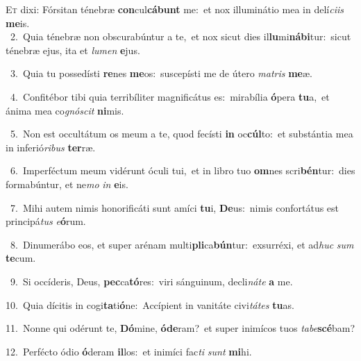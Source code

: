 \lettrine{\initial\textcolor{\initialcolor}{E}}{t} dixi: Fórsitan ténebræ \textbf{con}\-cul\-\textbf{cá}\-\textbf{bunt} me:~\star et nox illuminátio mea in delí\-\textit{ci}\-\textit{is} \textbf{me}\-is.\\
{\numbfont\textcolor{\numbcolor}{~2.}}~Quia ténebræ non obscurabúntur a te,~\dagger et nox sicut dies il\-\textbf{lu}\-mi\-\textbf{ná}\-\textbf{bi}tur:~\star sicut ténebræ ejus, ita et \textit{lu}\-\textit{men} \textbf{e}\-jus.\par
{\numbfont\textcolor{\numbcolor}{~3.}}~Quia tu possedísti \textbf{re}\-nes \textbf{me}\-os:~\star suscepísti me de útero \textit{ma}\-\textit{tris} \textbf{me}\-æ.\par
{\numbfont\textcolor{\numbcolor}{~4.}}~Confitébor tibi quia terribíliter magnificátus es:~\dagger mirabília \textbf{ó}\-pera \textbf{tu}\-a,~\star et ánima mea co\-\textit{gnó}\-\textit{scit} \textbf{ni}\-mis.\par
{\numbfont\textcolor{\numbcolor}{~5.}}~Non est occultátum os meum a te, quod fecísti \textbf{in} oc\-\textbf{cúl}\-to:~\star et substántia mea in inferió\-\textit{ri}\-\textit{bus} \textbf{ter}\-ræ.\par
{\numbfont\textcolor{\numbcolor}{~6.}}~Imperféctum meum vidérunt óculi tui,~\dagger et in libro tuo \textbf{om}\-nes scri\-\textbf{bén}\-tur:~\star dies formabúntur, et ne\textit{mo} \textit{in} \textbf{e}\-is.\par
{\numbfont\textcolor{\numbcolor}{~7.}}~Mihi autem nimis honorificáti sunt amíci \textbf{tu}\-i, \textbf{De}\-us:~\star nimis confortátus est principá\textit{tus} \textit{e}\-\textbf{ó}rum.\par
{\numbfont\textcolor{\numbcolor}{~8.}}~Dinumerábo eos, et super arénam multi\-\textbf{pli}\-ca\-\textbf{bún}\-tur:~\star exsurréxi, et ad\textit{huc} \textit{sum} \textbf{te}\-cum.\par
{\numbfont\textcolor{\numbcolor}{~9.}}~Si occíderis, Deus, \textbf{pec}\-ca\-\textbf{tó}\-res:~\star viri sánguinum, decli\-\textit{ná}\-\textit{te} \textbf{a} me.\par
{\numbfont\textcolor{\numbcolor}{10.}}~Quia dícitis in cogi\-\textbf{ta}\-ti\-\textbf{ó}\-ne:~\star Accípient in vanitáte civi\-\textit{tá}\-\textit{tes} \textbf{tu}\-as.\par
{\numbfont\textcolor{\numbcolor}{11.}}~Nonne qui odérunt te, \textbf{Dó}\-mine, \textbf{ó}\-\textbf{de}ram?~\star et super inimícos tuos \textit{ta}\-\textit{be}\textbf{scé}bam?\par
{\numbfont\textcolor{\numbcolor}{12.}}~Perfécto ódio \textbf{ó}\-deram \textbf{il}\-los:~\star et inimíci fac\textit{ti} \textit{sunt} \textbf{mi}\-hi.\par
